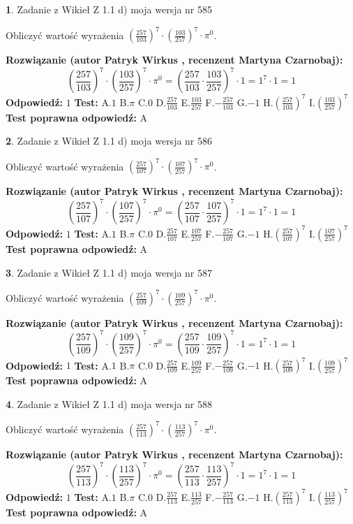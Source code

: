 \documentclass[12pt, a4paper]{article}
\theoremstyle{definition} %
\newtheorem{zad}{}
\newcommand{\zadStart}[1]{\begin{zad}#1\newline}
\newcommand{\zadStop}{\end{zad}}
\newcommand{\rozwStart}[2]{\noindent \textbf{Rozwiązanie (autor #1 , recenzent #2): }\newline}
\newcommand{\rozwStop}{\newline}
\newcommand{\odpStart}{\noindent \textbf{Odpowiedź:}\newline}
\newcommand{\odpStop}{\newline}
\newcommand{\testStart}{\noindent \textbf{Test:}\newline}
\newcommand{\testStop}{\newline}
\newcommand{\kluczStart}{\noindent \textbf{Test poprawna odpowiedź:}\newline}
\newcommand{\kluczStop}{\newline}
\begin{document}
\zadStart{Zadanie z Wikieł Z 1.1 d) moja wersja nr 585}

Obliczyć wartość wyrażenia $(\frac{257}{103})^{7} \cdot (\frac{103}{257})^{7} \cdot \pi^{0}$.
\zadStop
\rozwStart{Patryk Wirkus}{Martyna Czarnobaj}
$$(\frac{257}{103})^{7} \cdot (\frac{103}{257})^{7} \cdot \pi^{0} = (\frac{257}{103} \cdot \frac{103}{257})^{7} \cdot 1 = 1^{7} \cdot 1 = 1$$
\rozwStop
\odpStart
$1$
\odpStop
\testStart
A.$1$ B.$\pi$ C.$0$ D.$\frac{257}{103}$ E.$\frac{103}{257}$
F.$-\frac{257}{103}$ G.$-1$
H.$(\frac{257}{103})^{7}$
I.$(\frac{103}{257})^{7}$
\testStop
\kluczStart
A
\kluczStop



\zadStart{Zadanie z Wikieł Z 1.1 d) moja wersja nr 586}

Obliczyć wartość wyrażenia $(\frac{257}{107})^{7} \cdot (\frac{107}{257})^{7} \cdot \pi^{0}$.
\zadStop
\rozwStart{Patryk Wirkus}{Martyna Czarnobaj}
$$(\frac{257}{107})^{7} \cdot (\frac{107}{257})^{7} \cdot \pi^{0} = (\frac{257}{107} \cdot \frac{107}{257})^{7} \cdot 1 = 1^{7} \cdot 1 = 1$$
\rozwStop
\odpStart
$1$
\odpStop
\testStart
A.$1$ B.$\pi$ C.$0$ D.$\frac{257}{107}$ E.$\frac{107}{257}$
F.$-\frac{257}{107}$ G.$-1$
H.$(\frac{257}{107})^{7}$
I.$(\frac{107}{257})^{7}$
\testStop
\kluczStart
A
\kluczStop



\zadStart{Zadanie z Wikieł Z 1.1 d) moja wersja nr 587}

Obliczyć wartość wyrażenia $(\frac{257}{109})^{7} \cdot (\frac{109}{257})^{7} \cdot \pi^{0}$.
\zadStop
\rozwStart{Patryk Wirkus}{Martyna Czarnobaj}
$$(\frac{257}{109})^{7} \cdot (\frac{109}{257})^{7} \cdot \pi^{0} = (\frac{257}{109} \cdot \frac{109}{257})^{7} \cdot 1 = 1^{7} \cdot 1 = 1$$
\rozwStop
\odpStart
$1$
\odpStop
\testStart
A.$1$ B.$\pi$ C.$0$ D.$\frac{257}{109}$ E.$\frac{109}{257}$
F.$-\frac{257}{109}$ G.$-1$
H.$(\frac{257}{109})^{7}$
I.$(\frac{109}{257})^{7}$
\testStop
\kluczStart
A
\kluczStop



\zadStart{Zadanie z Wikieł Z 1.1 d) moja wersja nr 588}

Obliczyć wartość wyrażenia $(\frac{257}{113})^{7} \cdot (\frac{113}{257})^{7} \cdot \pi^{0}$.
\zadStop
\rozwStart{Patryk Wirkus}{Martyna Czarnobaj}
$$(\frac{257}{113})^{7} \cdot (\frac{113}{257})^{7} \cdot \pi^{0} = (\frac{257}{113} \cdot \frac{113}{257})^{7} \cdot 1 = 1^{7} \cdot 1 = 1$$
\rozwStop
\odpStart
$1$
\odpStop
\testStart
A.$1$ B.$\pi$ C.$0$ D.$\frac{257}{113}$ E.$\frac{113}{257}$
F.$-\frac{257}{113}$ G.$-1$
H.$(\frac{257}{113})^{7}$
I.$(\frac{113}{257})^{7}$
\testStop
\kluczStart
A
\kluczStop
\end{document}
